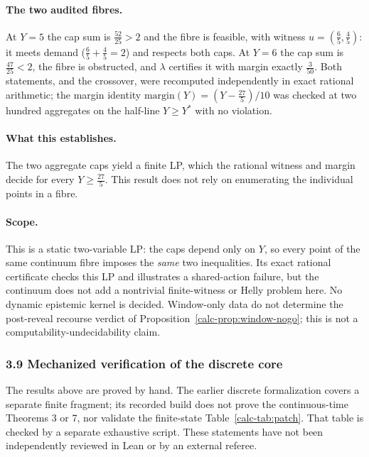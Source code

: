 \documentclass[10pt,twocolumn]{article}
\theoremstyle{definition}
\begin{document}
\paragraph{The two audited fibres.} At \(Y=5\) the cap sum is \(\tfrac{52}{25}>2\) and the
fibre is feasible, with witness \(u=(\tfrac65,\tfrac45)\): it meets demand
(\(\tfrac65+\tfrac45=2\)) and respects both caps. At \(Y=6\) the cap sum is
\(\tfrac{47}{25}<2\), the fibre is obstructed, and \(\lambda\) certifies it with margin
exactly \(\tfrac{3}{50}\). Both statements, and the crossover, were recomputed independently
in exact rational arithmetic; the margin identity
\(\mathrm{margin}(Y)=(Y-\tfrac{27}{5})/10\) was checked at two hundred aggregates on the
half-line \(Y\ge Y^{*}\) with no violation.

\paragraph{What this establishes.} The two aggregate caps yield a
finite LP, which the rational witness and margin decide for every
\(Y\ge\tfrac{27}{5}\). This result does not rely on enumerating the
individual points in a fibre.

\paragraph{Scope.} This is a static two-variable LP: the caps depend only on
\(Y\), so every point of the same continuum fibre imposes the \emph{same}
two inequalities. Its exact rational certificate checks this LP and
illustrates a shared-action failure, but the continuum does not add a
nontrivial finite-witness or Helly problem here. No dynamic epistemic
kernel is decided. Window-only data do not determine the post-reveal
recourse verdict of Proposition~\ref{calc-prop:window-nogo}; this is
not a computability-undecidability claim.

\subsubsection{3.9 Mechanized verification of the discrete core}
\label{calc-mech}

The results above are proved by hand. The earlier discrete formalization covers a separate finite fragment;
its recorded build does not prove the continuous-time Theorems 3 or 7,
nor validate the finite-state Table~\ref{calc-tab:patch}. That table is
checked by a separate exhaustive script. These statements have
not been independently reviewed in Lean or by an external referee.
\end{document}

